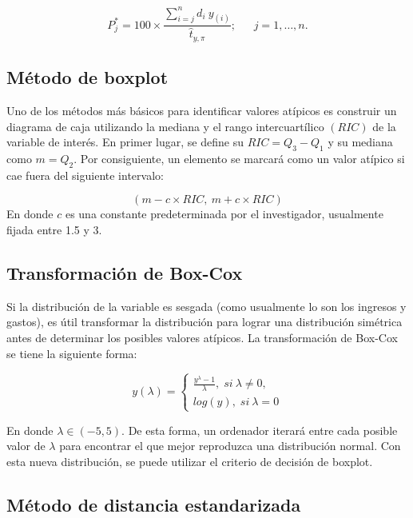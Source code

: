 \documentclass[
  12pt,
]{book}
\begin{document}
\[
P_j^*=100\times\frac{\sum_{i=j}^n d_i \ y_{(i)}}{\hat t_{y, \pi}}; \ \ \ \ \ \ \ j = 1, \ldots, n.
\]

\hypertarget{muxe9todo-de-boxplot}{%
\subsection{Método de boxplot}\label{muxe9todo-de-boxplot}}

Uno de los métodos más básicos para identificar valores atípicos es construir un diagrama de caja utilizando la mediana y el rango intercuartílico \((RIC)\) de la variable de interés. En primer lugar, se define su \(RIC = Q_3 - Q_1\) y su mediana como \(m=Q_2\). Por consiguiente, un elemento se marcará como un valor atípico si cae fuera del siguiente intervalo:

\[
(m-c \times RIC,\ m+c \times RIC)
\]
En donde \(c\) es una constante predeterminada por el investigador, usualmente fijada entre 1.5 y 3.

\hypertarget{transformaciuxf3n-de-box-cox}{%
\subsection{Transformación de Box-Cox}\label{transformaciuxf3n-de-box-cox}}

Si la distribución de la variable es sesgada (como usualmente lo son los ingresos y gastos), es útil transformar la distribución para lograr una distribución simétrica antes de determinar los posibles valores atípicos. La transformación de Box-Cox se tiene la siguiente forma:

\[
y(\lambda)=
\left\{
\begin{matrix}\frac{y^\lambda-1}{\lambda},\; si\ \lambda\neq0,\\
log(y),\;si\ \lambda=0
\end{matrix}\right.
\]

En donde \(\lambda\in(-5,5)\). De esta forma, un ordenador iterará entre cada posible valor de \(\lambda\) para encontrar el que mejor reproduzca una distribución normal. Con esta nueva distribución, se puede utilizar el criterio de decisión de boxplot.

\hypertarget{muxe9todo-de-distancia-estandarizada}{%
\subsection{Método de distancia estandarizada}\label{muxe9todo-de-distancia-estandarizada}}
\end{document}
